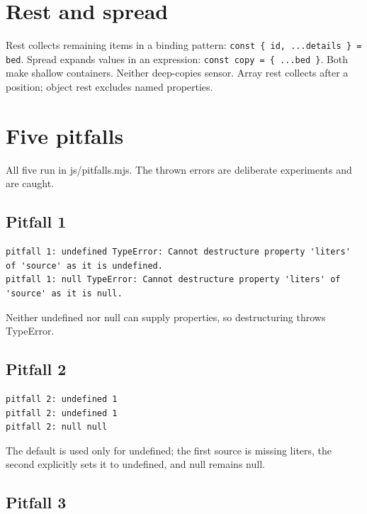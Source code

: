 \documentclass[
  10pt,
  a4paper,
]{article}
\begin{document}
\section{Rest and spread}\label{rest-and-spread}

Rest collects remaining items in a binding pattern:
\texttt{const \{ id,\allowbreak{} .\allowbreak{}.\allowbreak{}.\allowbreak{}details \} =\allowbreak{} bed}.
Spread expands values in an expression:
\texttt{const copy =\allowbreak{} \{ .\allowbreak{}.\allowbreak{}.\allowbreak{}bed \}}.
Both make shallow containers. Neither deep-copies sensor. Array rest
collects after a position; object rest excludes named properties.

\section{Five pitfalls}\label{five-pitfalls}

All five run in js/pitfalls.mjs. The thrown errors are deliberate
experiments and are caught.

\subsection{Pitfall 1}\label{pitfall-1}

\begin{lstlisting}
pitfall 1: undefined TypeError: Cannot destructure property 'liters' of 'source' as it is undefined.
pitfall 1: null TypeError: Cannot destructure property 'liters' of 'source' as it is null.
\end{lstlisting}

Neither undefined nor null can supply properties, so destructuring
throws TypeError.

\subsection{Pitfall 2}\label{pitfall-2}

\begin{lstlisting}
pitfall 2: undefined 1
pitfall 2: undefined 1
pitfall 2: null null
\end{lstlisting}

The default is used only for undefined; the first source is missing
liters, the second explicitly sets it to undefined, and null remains
null.

\subsection{Pitfall 3}\label{pitfall-3}
\end{document}
